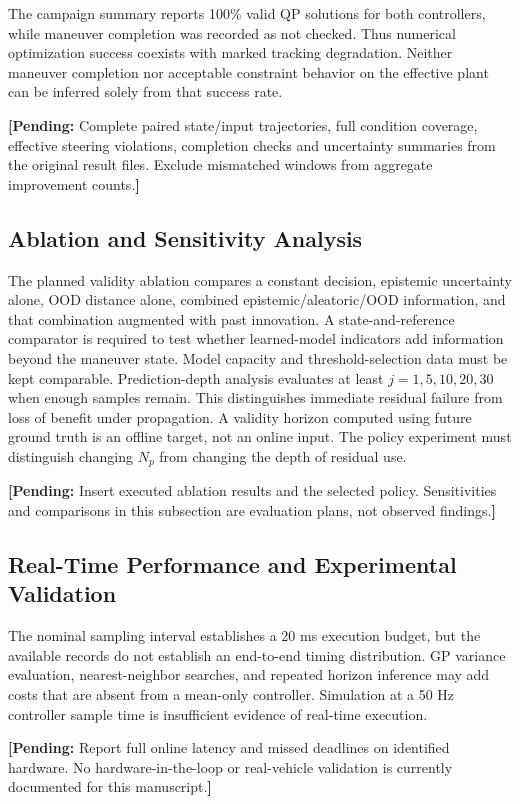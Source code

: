 \documentclass[10pt,journal]{IEEEtran}
\newcommand{\pending}[1]{\par\smallskip\noindent\textbf{[Pending:} #1\textbf{]}\par\smallskip}
\begin{document}
The campaign summary reports 100\% valid QP solutions for both controllers, while maneuver completion was recorded as not checked. Thus numerical optimization success coexists with marked tracking degradation. Neither maneuver completion nor acceptable constraint behavior on the effective plant can be inferred solely from that success rate.
\pending{Complete paired state/input trajectories, full condition coverage, effective steering violations, completion checks and uncertainty summaries from the original result files. Exclude mismatched windows from aggregate improvement counts.}

\subsection{Ablation and Sensitivity Analysis}
The planned validity ablation compares a constant decision, epistemic uncertainty alone, OOD distance alone, combined epistemic/aleatoric/OOD information, and that combination augmented with past innovation. A state-and-reference comparator is required to test whether learned-model indicators add information beyond the maneuver state. Model capacity and threshold-selection data must be kept comparable.
Prediction-depth analysis evaluates at least $j=1,5,10,20,30$ when enough samples remain. This distinguishes immediate residual failure from loss of benefit under propagation. A validity horizon computed using future ground truth is an offline target, not an online input. The policy experiment must distinguish changing $N_p$ from changing the depth of residual use.
\pending{Insert executed ablation results and the selected policy. Sensitivities and comparisons in this subsection are evaluation plans, not observed findings.}

\subsection{Real-Time Performance and Experimental Validation}
The nominal sampling interval establishes a 20 ms execution budget, but the available records do not establish an end-to-end timing distribution. GP variance evaluation, nearest-neighbor searches, and repeated horizon inference may add costs that are absent from a mean-only controller. Simulation at a 50 Hz controller sample time is insufficient evidence of real-time execution.
\pending{Report full online latency and missed deadlines on identified hardware. No hardware-in-the-loop or real-vehicle validation is currently documented for this manuscript.}
\end{document}

